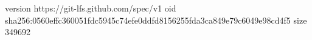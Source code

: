 version https://git-lfs.github.com/spec/v1
oid sha256:0560effc360051fdc5945c74efe0ddfd8156255fda3ca849e79c6049e98cd4f5
size 349692
